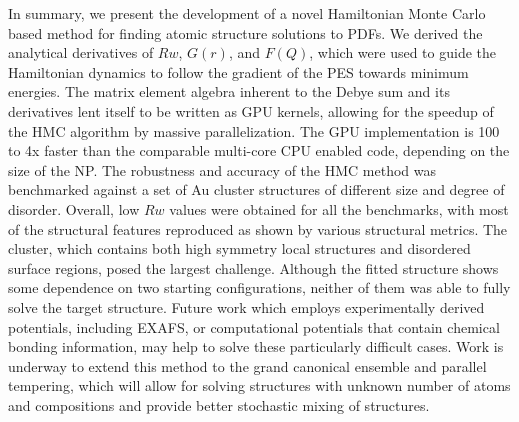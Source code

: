 In summary, we present the development of a novel Hamiltonian Monte Carlo based method for finding atomic structure solutions to PDFs.   We derived the analytical derivatives of $Rw$, $G(r)$, and $F(Q)$, which were used to guide the Hamiltonian dynamics to follow the gradient of the PES towards minimum energies.  The matrix element algebra inherent to the Debye sum and its derivatives lent itself to be written as GPU kernels, allowing for the speedup of the HMC algorithm by massive parallelization.  The GPU implementation is 100 to 4x faster than the comparable multi-core CPU enabled code, depending on the size of the NP.  The  robustness and accuracy of the HMC method was benchmarked against a set of Au cluster structures of different size and degree of disorder.  Overall,  low $Rw$ values were obtained for all the benchmarks, with most of the structural features reproduced as shown by various structural metrics.  The  cluster, which contains both high symmetry local structures and disordered surface regions,  posed the largest challenge. Although the fitted structure shows some dependence on two starting configurations,  neither of them was able to fully solve the target structure.
Future work which employs experimentally derived potentials, including EXAFS, or computational potentials that contain chemical bonding information, may help to solve these particularly difficult cases.
Work is underway to extend this method to the grand canonical ensemble and parallel tempering, which will allow for solving structures with unknown number of atoms and compositions and provide better stochastic mixing of structures.